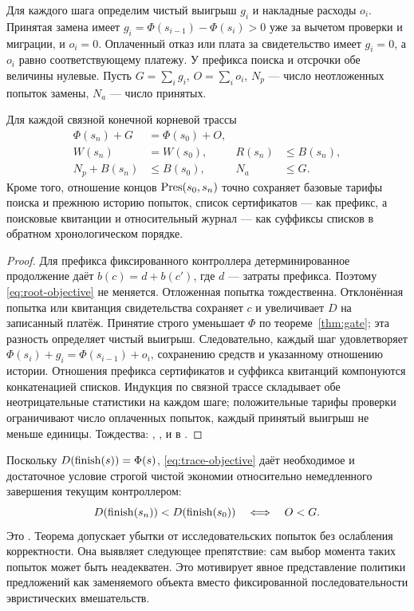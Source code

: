 Для каждого шага определим чистый выигрыш $g_i$ и накладные расходы $o_i$. Принятая замена имеет $g_i=\Phi(s_{i-1})-\Phi(s_i)>0$ уже за вычетом проверки и миграции, и $o_i=0$. Оплаченный отказ или плата за свидетельство имеет $g_i=0$, а $o_i$ равно соответствующему платежу. У префикса поиска и отсрочки обе величины нулевые. Пусть $G=\sum_i g_i$, $O=\sum_i o_i$, $N_p$ --- число неотложенных попыток замены, $N_a$ --- число принятых.

\begin{theorem}\label{thm:root-trace}
Для каждой связной конечной корневой трассы
\begin{align}
 \Phi(s_n)+G&=\Phi(s_0)+O,\label{eq:trace-objective}\\
 W(s_n)&=W(s_0),& R(s_n)&\le B(s_n),\label{eq:trace-funds}\\
 N_p+B(s_n)&\le B(s_0),& N_a&\le G.
\end{align}
Кроме того, отношение концов $\operatorname{Pres}(s_0,s_n)$ точно сохраняет базовые тарифы поиска и прежнюю историю попыток, список сертификатов --- как префикс, а поисковые квитанции и относительный журнал --- как суффиксы списков в обратном хронологическом порядке.
\end{theorem}
\begin{proof}
Для префикса фиксированного контроллера детерминированное продолжение даёт $b(c)=d+b(c')$, где $d$ --- затраты префикса. Поэтому \eqref{eq:root-objective} не меняется. Отложенная попытка тождественна. Отклонённая попытка или квитанция свидетельства сохраняет $c$ и увеличивает $D$ на записанный платёж. Принятие строго уменьшает $\Phi$ по теореме~\ref{thm:gate}; эта разность определяет чистый выигрыш. Следовательно, каждый шаг удовлетворяет $\Phi(s_i)+g_i=\Phi(s_{i-1})+o_i$, сохранению средств и указанному отношению истории. Отношения префикса сертификатов и суффикса квитанций компонуются конкатенацией списков. Индукция по связной трассе складывает обе неотрицательные статистики на каждом шаге; положительные тарифы проверки ограничивают число оплаченных попыток, каждый принятый выигрыш не меньше единицы. Тождества: , ,  и  в .
\end{proof}
Поскольку $D(\operatorname{finish}(s))=\Phi(s)$, \eqref{eq:trace-objective} даёт необходимое и достаточное условие строгой чистой экономии относительно немедленного завершения текущим контроллером:
\begin{equation}\label{eq:net-gain}
 D(\operatorname{finish}(s_n))<D(\operatorname{finish}(s_0))\quad\Longleftrightarrow\quad O<G.
\end{equation}
Это . Теорема допускает убытки от исследовательских попыток без ослабления корректности. Она выявляет следующее препятствие: сам выбор момента таких попыток может быть неадекватен. Это мотивирует явное представление политики предложений как заменяемого объекта вместо фиксированной последовательности эвристических вмешательств.
